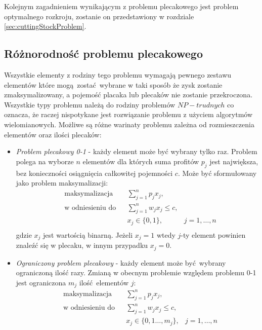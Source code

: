 Kolejnym zagadnieniem wynikającym z problemu plecakowego jest problem optymalnego rozkroju, zostanie on przedstawiony w rozdziale \ref{sec:cuttingStockProblem}.
\subsection{Różnorodność problemu plecakowego}
Wszystkie elementy z rodziny tego problemu wymagają pewnego zestawu elementów które mogą zostać wybrane w taki sposób że zysk zostanie zmaksymalizowany, a pojemość placaka lub plecaków nie zostanie przekroczona. Wszystkie typy problemu należą do rodziny problemów $NP-trudnych$ co oznacza, że raczej nispotykane jest rozwiązanie problemu z użyciem algorytmów wielomianowych. Możliwe są różne warinaty problemu zależna od rozmieszczenia elementów oraz ilości plecaków\cite{PisingerThesis}:
\begin{itemize}
  \item \textit{Problem plecakowy 0-1} - każdy element może być wybrany tylko raz. Problem polega na wyborze $n$ elementów dla których suma profitów $p_j$ jest największa, bez konieczności osiągnięcia całkowitej pojemności $c$. Może być sformułowany jako problem maksymalizacji:
  \begin{equation}\label{01Knapsack}
    \begin{aligned}
      & \textrm{maksymalizacja} & & \sum_{j=1}^n p_jx_j, \\
      & \textrm{w odniesieniu do} & & \sum_{j=1}^n w_jx_j \le c, \\
      &&& x_j \in \{0,1\},& j = 1,\dots,n \\
    \end{aligned}
  \end{equation}
  gdzie $x_j$ jest wartością binarną. Jeżeli $x_j = 1$ wtedy $j$-ty element powinien znaleźć się w plecaku, w innym przypadku $x_j = 0$.
  \item \textit{Ograniczony problem plecakowy} - każdy element może być wybrany ograniczoną ilość razy. Zmianą w obecnym problemie względem problemu 0-1 jest ograniczona $m_j$ ilość elementów $j$:
  \begin{equation}\label{boundedKnapsack}
    \begin{aligned}
      & \textrm{maksymalizacja} & & \sum_{j=1}^n p_jx_j, \\
      & \textrm{w odniesieniu do} & & \sum_{j=1}^n w_jx_j \le c, \\
      &&& x_j \in \{0,1\dots,m_j\},& j = 1,\dots,n \\
    \end{aligned}

\end{equation}
\end{itemize}
